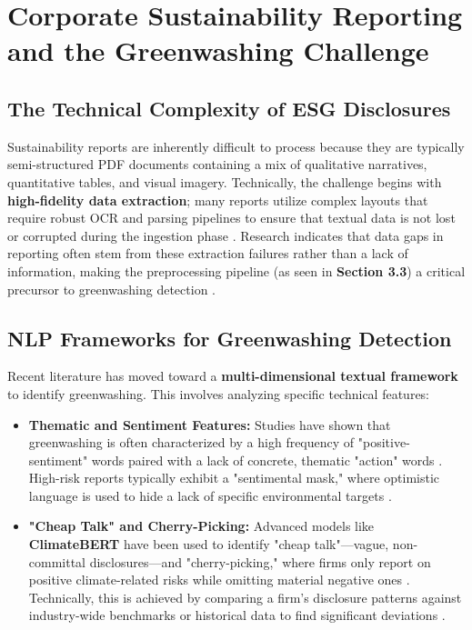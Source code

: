 \section{ Corporate Sustainability Reporting and the Greenwashing Challenge}
\subsection{ The Technical Complexity of ESG Disclosures}

Sustainability reports are inherently difficult to process because they are typically semi-structured PDF documents containing a mix of qualitative narratives, quantitative tables, and visual imagery. Technically, the challenge begins with \textbf{high-fidelity data extraction}; many reports utilize complex layouts that require robust OCR and parsing pipelines to ensure that textual data is not lost or corrupted during the ingestion phase  \parencite[]{marco_bronzini_bf94d949, jacob_beck_9548a833}. Research indicates that data gaps in reporting often stem from these extraction failures rather than a lack of information, making the preprocessing pipeline (as seen in \textbf{Section 3.3}) a critical precursor to greenwashing detection  \parencite{jacob_beck_9548a833}.
\subsection{ NLP Frameworks for Greenwashing Detection}

Recent literature has moved toward a \textbf{multi-dimensional textual framework} to identify greenwashing. This involves analyzing specific technical features:
\begin{itemize}
\item 

\textbf{Thematic and Sentiment Features:} Studies have shown that greenwashing is often characterized by a high frequency of "positive-sentiment" words paired with a lack of concrete, thematic "action" words  \parencite{xiaojia_wang_02351a60}. High-risk reports typically exhibit a "sentimental mask," where optimistic language is used to hide a lack of specific environmental targets  \parencite{xiaojia_wang_02351a60}.\item 

\textbf{"Cheap Talk" and Cherry-Picking:} Advanced models like \textbf{ClimateBERT} have been used to identify "cheap talk"—vague, non-committal disclosures—and "cherry-picking," where firms only report on positive climate-related risks while omitting material negative ones  \parencite{julia_bingler_268445e3}. Technically, this is achieved by comparing a firm's disclosure patterns against industry-wide benchmarks or historical data to find significant deviations  \parencite{julia_bingler_268445e3}.
\end{itemize}
